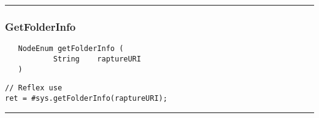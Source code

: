 \rule{15cm}{2pt}
\subsubsection{GetFolderInfo}
\label{Api:GetFolderInfo}
\begin{verbatim}
   NodeEnum getFolderInfo (
           String    raptureURI
   )
\end{verbatim}
\begin{lstlisting}[language=reflex]
// Reflex use
ret = #sys.getFolderInfo(raptureURI);
\end{lstlisting}



\rule{15cm}{2pt}
